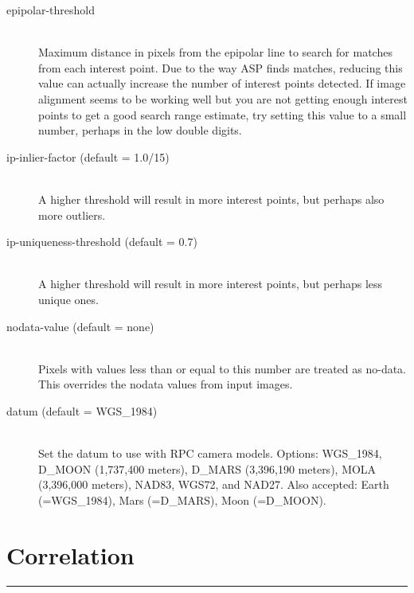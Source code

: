 \begin{description}
\item[epipolar-threshold]  \hfill \\
Maximum distance in pixels from the epipolar line to search for matches from each
interest point.  Due to the way ASP finds matches, reducing this value can actually
increase the number of interest points detected.  If image alignment seems to be working
well but you are not getting enough interest points to get a good search range estimate,
try setting this value to a small number, perhaps in the low double digits.

\item[ip-inlier-factor \textnormal (default = 1.0/15)] \hfill \\
A higher threshold will result in more interest points, but perhaps also more outliers.

\item[ip-uniqueness-threshold \textnormal (default = 0.7)] \hfill \\
A higher threshold will result in more interest points, but perhaps less unique ones.

\item[nodata-value \textnormal (default = none)] \hfill \\
Pixels with values less than or equal to this number are treated as
no-data. This overrides the nodata values from input images.

\item[datum \textnormal (default = WGS\_1984)] \hfill \\ Set the datum
to use with RPC camera models. Options: WGS\_1984, D\_MOON (1,737,400
meters), D\_MARS (3,396,190 meters), MOLA (3,396,000 meters), NAD83,
WGS72, and NAD27. Also accepted: Earth (=WGS\_1984), Mars (=D\_MARS), Moon
(=D\_MOON).

\end{description}



\section{Correlation}
\label{corr_section}
\hrule
\bigskip


